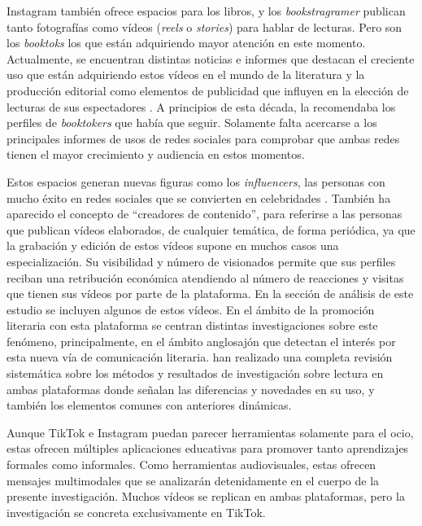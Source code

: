 Instagram también ofrece espacios para los libros, y los
\emph{bookstragramer} publican tanto fotografías como vídeos
(\emph{reels} o \emph{stories}) para hablar de lecturas. Pero son los
\emph{booktoks} los que están adquiriendo mayor atención en este
momento. Actualmente, se encuentran distintas noticias e informes que
destacan el creciente uso que están adquiriendo estos vídeos en el mundo
de la literatura y la producción editorial como elementos de publicidad
que influyen en la elección de lecturas de sus espectadores \cite{nielsen2021}. A principios de esta década, la \textcite{penguin2020}
recomendaba los perfiles de \emph{booktokers} que había que seguir.
Solamente falta acercarse a los principales informes de usos de redes
sociales \cite{IABSpain2022} para comprobar que ambas redes tienen el mayor
crecimiento y audiencia en estos momentos.

Estos espacios generan nuevas figuras como los \emph{influencers}, las
personas con mucho éxito en redes sociales que se convierten en
celebridades \cite{abidin2020}. También ha aparecido el concepto de
``creadores de contenido'', para referirse a las personas que publican
vídeos elaborados, de cualquier temática, de forma periódica, ya que la
grabación y edición de estos vídeos supone en muchos casos una
especialización. Su visibilidad \cite{cordon2019} y
número de visionados permite que sus perfiles reciban una retribución
económica atendiendo al número de reacciones y visitas que tienen sus
vídeos por parte de la plataforma. En la sección de análisis de este
estudio se incluyen algunos de estos vídeos. En el ámbito de la
promoción literaria con esta plataforma se centran distintas
investigaciones sobre este fenómeno, principalmente, en el ámbito
anglosajón \cite{merga2021,martens2022} que detectan
el interés por esta nueva vía de comunicación literaria. \textcite{sanztejeda} han realizado una completa revisión sistemática sobre los
métodos y resultados de investigación sobre lectura en ambas plataformas
donde señalan las diferencias y novedades en su uso, y también los
elementos comunes con anteriores dinámicas.

Aunque TikTok e Instagram puedan parecer herramientas solamente para el
ocio, estas ofrecen múltiples aplicaciones educativas para promover
tanto aprendizajes formales como informales. Como herramientas
audiovisuales, estas ofrecen mensajes multimodales \cite{newlondongroup1996} que se analizarán detenidamente en el cuerpo de la presente
investigación. Muchos vídeos se replican en ambas plataformas, pero la
investigación se concreta exclusivamente en TikTok.

